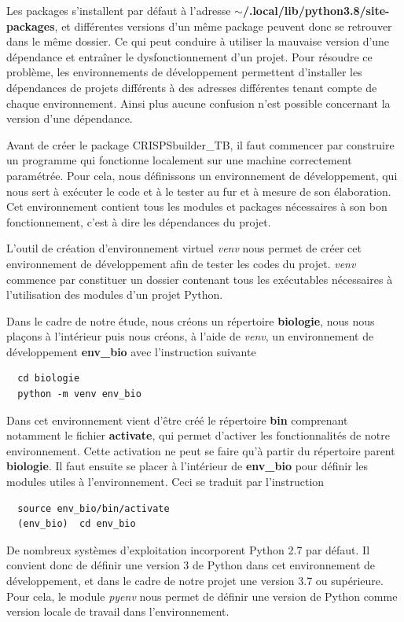 \documentclass[twoside,a4paper,11pt,frenchb,openany]{report}
\begin{document}
Les packages s'installent par défaut à l'adresse \textbf{$\sim$/.local/lib/python3.8/site-packages}, et différentes versions d'un même package peuvent donc se retrouver dans le même dossier. Ce qui peut conduire à utiliser la mauvaise version d'une dépendance et entraîner le dysfonctionnement d'un projet. Pour résoudre ce problème, les environnements de développement permettent d'installer les dépendances de projets différents à des adresses différentes tenant compte de chaque environnement. Ainsi plus aucune confusion n'est possible concernant la version d'une dépendance.

Avant de créer le package CRISPSbuilder\_TB, il faut commencer par construire un programme qui fonctionne localement sur une machine correctement paramétrée. Pour cela, nous définissons un environnement de développement, qui nous sert à exécuter le code et à le tester au fur et à mesure de son élaboration. Cet environnement contient tous les modules et packages nécessaires à son bon fonctionnement, c'est à dire les dépendances du projet.
 
L'outil de création d'environnement virtuel \textit{venv} nous permet de créer cet environnement de développement afin de tester les codes du projet. \textit{venv} commence par constituer un dossier contenant tous les exécutables nécessaires à l'utilisation des modules d'un projet Python. 

Dans le cadre de notre étude, nous créons un répertoire \textbf{biologie}, nous nous plaçons à l'intérieur puis nous créons, à l'aide de \textit{venv}, un environnement de développement \textbf{env\_bio} avec l'instruction suivante
\begin{verbatim}  cd biologie
  python -m venv env_bio\end{verbatim}

Dans cet environnement vient d'être créé le répertoire \textbf{bin} comprenant notamment le fichier\textbf{ activate}, qui permet d'activer les fonctionnalités de notre environnement.
Cette activation ne peut se faire qu'à partir du répertoire parent \textbf{biologie}. Il faut ensuite se placer à l'intérieur de \textbf{env\_bio} pour définir les modules utiles à l'environnement. Ceci se traduit par l'instruction
 \begin{verbatim}  source env_bio/bin/activate
  (env_bio)  cd env_bio\end{verbatim}

De nombreux systèmes d'exploitation incorporent Python 2.7 par défaut. Il convient donc de définir une version 3 de Python dans cet environnement de développement, et dans le cadre de notre projet une version 3.7 ou supérieure. Pour cela, le module \textit{pyenv}  nous permet de définir une version de Python comme version locale de travail dans l'environnement. 
\end{document}
